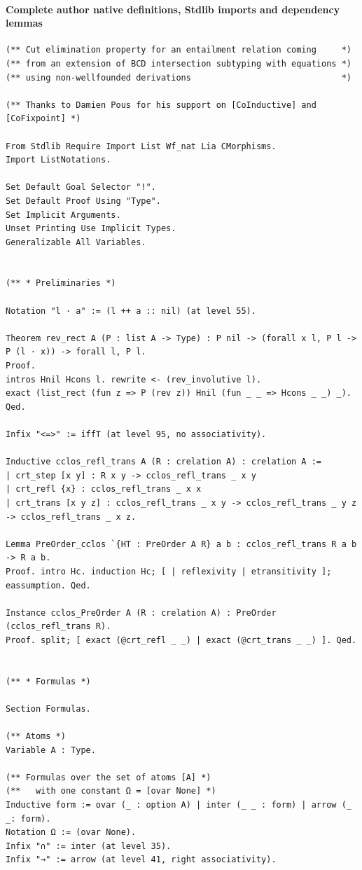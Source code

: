 \paragraph{Complete author native definitions, Stdlib imports and dependency lemmas}
\begin{lstlisting}
(** Cut elimination property for an entailment relation coming     *)
(** from an extension of BCD intersection subtyping with equations *)
(** using non-wellfounded derivations                              *)

(** Thanks to Damien Pous for his support on [CoInductive] and [CoFixpoint] *)

From Stdlib Require Import List Wf_nat Lia CMorphisms.
Import ListNotations.

Set Default Goal Selector "!".
Set Default Proof Using "Type".
Set Implicit Arguments.
Unset Printing Use Implicit Types.
Generalizable All Variables.


(** * Preliminaries *)

Notation "l · a" := (l ++ a :: nil) (at level 55).

Theorem rev_rect A (P : list A -> Type) : P nil -> (forall x l, P l -> P (l · x)) -> forall l, P l.
Proof.
intros Hnil Hcons l. rewrite <- (rev_involutive l).
exact (list_rect (fun z => P (rev z)) Hnil (fun _ _ => Hcons _ _) _).
Qed.

Infix "<=>" := iffT (at level 95, no associativity).

Inductive cclos_refl_trans A (R : crelation A) : crelation A :=
| crt_step [x y] : R x y -> cclos_refl_trans _ x y
| crt_refl {x} : cclos_refl_trans _ x x
| crt_trans [x y z] : cclos_refl_trans _ x y -> cclos_refl_trans _ y z -> cclos_refl_trans _ x z.

Lemma PreOrder_cclos `{HT : PreOrder A R} a b : cclos_refl_trans R a b -> R a b.
Proof. intro Hc. induction Hc; [ | reflexivity | etransitivity ]; eassumption. Qed.

Instance cclos_PreOrder A (R : crelation A) : PreOrder (cclos_refl_trans R).
Proof. split; [ exact (@crt_refl _ _) | exact (@crt_trans _ _) ]. Qed.


(** * Formulas *)

Section Formulas.

(** Atoms *)
Variable A : Type.

(** Formulas over the set of atoms [A] *)
(**   with one constant Ω = [ovar None] *)
Inductive form := ovar (_ : option A) | inter (_ _ : form) | arrow (_ _: form).
Notation Ω := (ovar None).
Infix "∩" := inter (at level 35).
Infix "→" := arrow (at level 41, right associativity).


\end{lstlisting}
